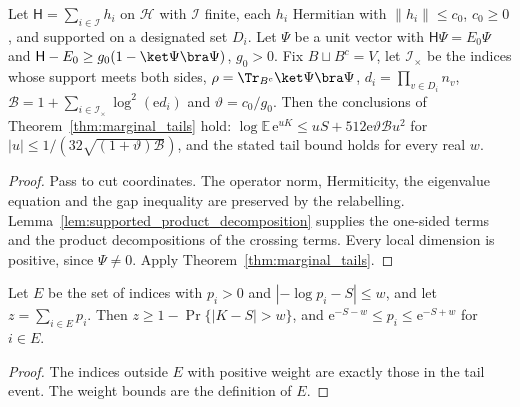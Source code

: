\begin{theorem}
    \label{thm:marginal_tails_supports}
    \leanok
    Let $\mathsf H=\sum_{i\in\mathcal I}h_i$ on $\mathcal H$ with $\mathcal I$
    finite, each $h_i$ Hermitian with $\lVert h_i\rVert\le c_0$, $c_0\ge0$, and
    supported on a designated set $D_i$. Let $\Psi$ be a unit vector with
    $\mathsf H\Psi=E_0\Psi$ and $\mathsf H-E_0\ge g_0(1-\ket\Psi\bra\Psi)$,
    $g_0>0$. Fix $B\sqcup B^c=V$, let $\mathcal I_\times$ be the indices whose
    support meets both sides, $\rho=\Tr_{B^c}\ket\Psi\bra\Psi$,
    $d_i=\prod_{v\in D_i}n_v$,
    $\mathcal B=1+\sum_{i\in\mathcal I_\times}\log^2(\mathrm ed_i)$ and
    $\vartheta=c_0/g_0$. Then the conclusions of
    Theorem~\ref{thm:marginal_tails} hold:
    $\log\mathbb E\,\mathrm e^{uK}\le uS+512\mathrm e\vartheta\mathcal Bu^2$
    for $|u|\le1/(32\sqrt{(1+\vartheta)\mathcal B})$, and the stated tail bound
    holds for every real $w$.
\end{theorem}
\begin{proof}\leanok
    Pass to cut coordinates. The operator norm, Hermiticity, the eigenvalue
    equation and the gap inequality are preserved by the relabelling.
    Lemma~\ref{lem:supported_product_decomposition} supplies the one-sided
    terms and the product decompositions of the crossing terms. Every local
    dimension is positive, since $\Psi\ne0$. Apply
    Theorem~\ref{thm:marginal_tails}.
\end{proof}

\begin{lemma}
    \label{lem:typical_set}
    \leanok
    Let $E$ be the set of indices with $p_i>0$ and $|-\log p_i-S|\le w$, and
    let $z=\sum_{i\in E}p_i$. Then $z\ge1-\Pr\{|K-S|>w\}$, and
    $\mathrm e^{-S-w}\le p_i\le\mathrm e^{-S+w}$ for $i\in E$.
\end{lemma}
\begin{proof}\leanok
    The indices outside $E$ with positive weight are exactly those in the
    tail event. The weight bounds are the definition of $E$.
\end{proof}

